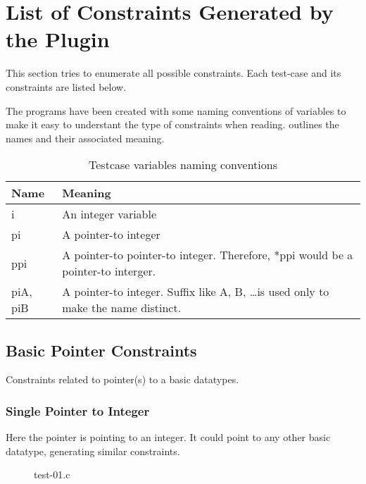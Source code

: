 \section{List of Constraints Generated by the Plugin}\label{sec:constraints}
This section tries to enumerate all possible constraints. Each test-case and its constraints are listed below.

The programs have been created with some naming conventions of variables to make it easy to understant the type of constraints when reading.  outlines the names and their associated meaning.

\begin{table}
\begin{center}
    \begin{tabular}{| m{2cm} | m{7cm} |}
    \hline
    \textbf{Name} & \textbf{Meaning} \\
    \hline
    \hline
    i & An integer variable \\
    \hline
    pi & A pointer-to integer \\
    \hline
    ppi & A pointer-to pointer-to integer. Therefore, *ppi would be a pointer-to interger. \\
    \hline
    piA, piB & A pointer-to integer. Suffix like A, B, \ldots is used only to make the name distinct. \\
    \hline
    \end{tabular}
    \caption{Testcase variables naming conventions}
    \label{table:varname}
\end{center}
\end{table}

\subsection{Basic Pointer Constraints}
Constraints related to pointer(s) to a basic datatypes.
\subsubsection{Single Pointer to Integer} Here the pointer is pointing to an integer. It could point to any other basic datatype, generating similar constraints.

\begin{figure}
\label{fig:test-01}

\caption{test-01.c}
\end{figure}

